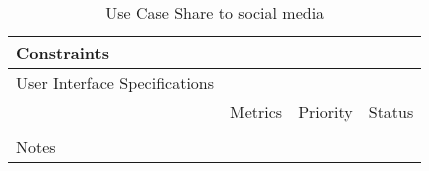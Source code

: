 \begin{table}[H]
\begin{tabularx}{\linewidth}{|l|X|X|X|}
    \hline Constraints                   & \multicolumn{3}{l|}{}                                                                                 \\

    \hline User Interface Specifications & \multicolumn{3}{l|}{}                                                                                 \\

    \hline \multirow{2}{*}{}             & Metrics                                                                           & Priority & Status \\
    \cline{2-4}                          &                                                                                   &          &        \\
    \hline Notes                         & \multicolumn{3}{l|}{}                                                                                 \\
    \hline
  \end{tabularx}
  \caption{Use Case Share to social media}
  \label{tab:use_case_share_to_social_media}
\end{table}

